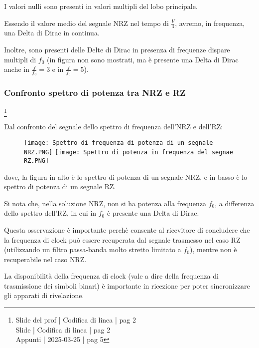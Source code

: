 I valori nulli sono presenti in valori multipli del lobo principale. \newline 

Essendo il valore medio del segnale NRZ nel tempo di $\frac{V}{4}$, avremo, in frequenza, una Delta di Dirac in continua. \newline 

Inoltre, sono presenti delle Delte di Dirac in presenza di frequenze dispare multipli di $f_0$ (in figura non sono mostrati, ma è presente una Delta di Dirac anche in $\frac{f}{f_0} = 3$ e in $\frac{f}{f_0} = 5$). \newline 

\newpage 

\subsubsection{Confronto spettro di potenza tra NRZ e RZ}
\footnote{Slide del prof | Codifica di linea | pag 2 \\ 
Slide | Codifica di linea | pag  2\\ 
Appunti | 2025-03-25 | pag 5
}

Dal confronto del segnale dello spettro di frequenza dell'NRZ e dell'RZ: 

\begin{figure}[h]
    \centering
    \texttt{[image: Spettro di frequenza di potenza di un segnale NRZ.PNG]}
    \texttt{[image: Spettro di potenza in frequenza del segnae RZ.PNG]}
\end{figure} 

dove, la figura in alto è lo spettro di potenza di un segnale NRZ, 
e in basso è lo spettro di potenza di un segnale RZ. \newline 

Si nota che, nella soluzione NRZ, non si ha potenza alla frequenza $f_0$, 
a differenza dello spettro dell'RZ, in cui in $f_0$ è presente una Delta di Dirac. \newline 

Questa osservazione è importante perchè consente al ricevitore di concludere che la frequenza di clock può essere recuperata dal segnale trasmesso nel caso RZ (utilizzando un filtro passa-banda molto stretto limitato a $f_0$), 
mentre non è recuperabile nel caso NRZ. \newline 

La disponibilità della frequenza di clock (vale a dire della frequenza di trasmissione dei simboli binari) 
è importante in ricezione per poter sincronizzare gli apparati di rivelazione. \newline 

